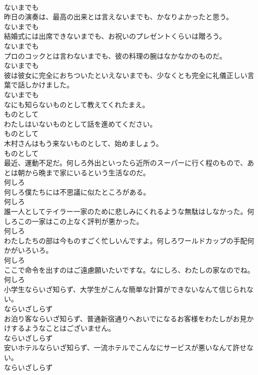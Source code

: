 \documentclass[8pt]{extreport}
\begin{document}
\begin{CJK}{UTF8}{min}
\\	ないまでも
\\	昨日の演奏は、最高の出来とは言えないまでも、かなりよかったと思う。	
\\	ないまでも
\\	結婚式には出席できないまでも、お祝いのプレゼントくらいは贈ろう。	
\\	ないまでも
\\	プロのコックとは言わないまでも、彼の料理の腕はなかなかのものだ。	
\\	ないまでも
\\	彼は彼女に完全におちついたといえないまでも、少なくとも完全に礼儀正しい言葉で話しかけました。	
\\	ないまでも
\\	なにも知らないものとして教えてくれたまえ。	
\\	ものとして
\\	わたしはいないものとして話を進めてください。	
\\	ものとして
\\	木村さんはもう来ないものとして、始めましょう。	
\\	ものとして
\\	最近、運動不足だ。何しろ外出といったら近所のスーパーに行く程のもので、あとは朝から晩まで家にいるという生活なのだ。	
\\	何しろ
\\	何しろ僕たちには不思議に似たところがある。	
\\	何しろ
\\	誰一人としてテイラー一家のために悲しみにくれるような無駄はしなかった。何しろこの一家はこの上なく評判が悪かった。	
\\	何しろ
\\	わたしたちの部は今ものすごく忙しいんですよ。何しろワールドカップの手配何かがいろいろ。	
\\	何しろ
\\	ここで命令を出すのはご遠慮願いたいですな。なにしろ、わたしの家なのでね。	
\\	何しろ
\\	小学生ならいざ知らず、大学生がこんな簡単な計算ができないなんて信じられない。	
\\	ならいざしらず
\\	お泊り客ならいざ知らず、普通新宿通りへおいでになるお客様をわたしがお見かけするようなことはございません。	
\\	ならいざしらず
\\	安いホテルならいざ知らず、一流ホテルでこんなにサービスが悪いなんて許せない。	
\\	ならいざしらず

\end{CJK}
\end{document}
